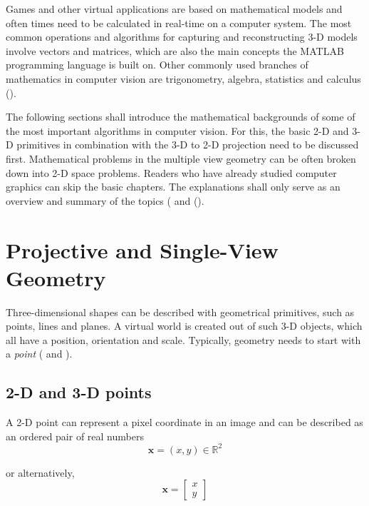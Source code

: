Games and other virtual applications are based on mathematical models and often times need to be calculated in real-time on a computer system. The most common operations and algorithms for capturing and reconstructing 3-D models involve vectors and matrices, which are also the main concepts the MATLAB programming language is built on. Other commonly used branches of mathematics in computer vision are trigonometry, algebra, statistics and calculus (\cite[p.165]{Gregory.2014}).

The following sections shall introduce the mathematical backgrounds of some of the most important algorithms in computer vision. For this, the basic 2-D and 3-D primitives in combination with the 3-D to 2-D projection need to be discussed first. Mathematical problems in the multiple view geometry can be often broken down into 2-D space problems. Readers who have already studied computer graphics can skip the basic chapters. The explanations shall only serve as an overview and summary of the topics (\cite[p.29]{Szeliski.2011} and (\cite[p.165 et seq.]{Gregory.2014}).

\section{Projective and Single-View Geometry}
Three-dimensional shapes can be described with geometrical primitives, such as points, lines and planes. A virtual world is created out of such 3-D objects, which all have a position, orientation and scale. Typically, geometry needs to start with a \textit{point} (\cite[p.29 et seqq.]{Szeliski.2011} and \cite[p.166 et seqq.]{Gregory.2014}).

\subsection{2-D and 3-D points}\label{ssec:Points}
A 2-D point can represent a pixel coordinate in an image and can be described as an ordered pair of real numbers 
\begin{equation}
\mathbf{x} = (x,y)\in \mathbb{R}^2
\end{equation}

or alternatively, 
\begin{equation} 
\mathbf{x}=
  \begin{bmatrix}
   x \\
   y
  \end{bmatrix}
\end{equation}

